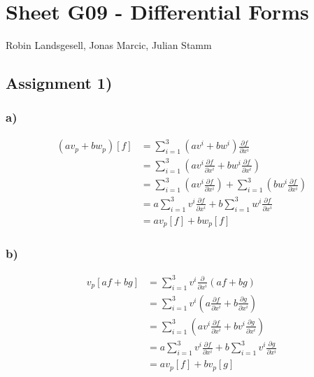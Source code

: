 \documentclass{article}
\begin{document}
\section*{Sheet G09 - Differential Forms}
Robin Landsgesell, Jonas Marcic, Julian Stamm

\subsection*{Assignment 1)}
\subsubsection*{a)}
\begin{align*}
	(av_p + bw_p)[f] &= \sum_{i=1}^3 (av^i + bw^i) \frac{\partial f}{\partial x^i}\\
	&= \sum_{i=1}^3 \left( a v^i \frac{\partial f}{\partial x^i} + b w^i \frac{\partial f}{\partial x^i} \right)\\
	&= \sum_{i=1}^3 \left( a v^i \frac{\partial f}{\partial x^i} \right) + \sum_{i=1}^3 \left( b w^i \frac{\partial f}{\partial x^i} \right)\\
	&= a \sum_{i=1}^3 v^i \frac{\partial f}{\partial x^i} + b \sum_{i=1}^3 w^i \frac{\partial f}{\partial x^i}\\
	&= a v_p[f] + b w_p[f]
\end{align*}

\subsubsection*{b)}
\begin{align*}
	v_p[af + bg] &= \sum_{i=1}^3 v^i \frac{\partial}{\partial x^i} (af + bg)\\
	&= \sum_{i=1}^3 v^i \left( a \frac{\partial f}{\partial x^i} + b \frac{\partial g}{\partial x^i} \right)\\
	&= \sum_{i=1}^3 \left( a v^i \frac{\partial f}{\partial x^i} + b v^i \frac{\partial g}{\partial x^i} \right)\\
	&= a \sum_{i=1}^3 v^i \frac{\partial f}{\partial x^i} + b \sum_{i=1}^3 v^i \frac{\partial g}{\partial x^i}\\
	&= a v_p[f] + b v_p[g]
\end{align*}
\end{document}
